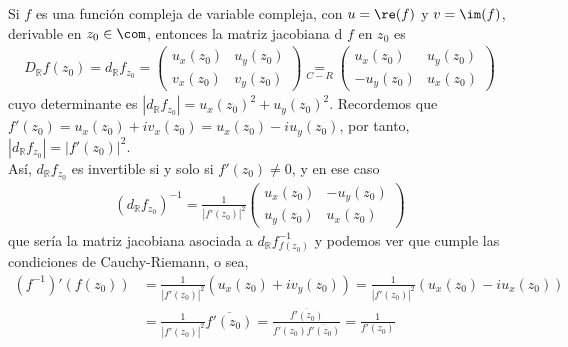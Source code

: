 \begin{obs}
Si $f$ es una función compleja de variable compleja, con $u = \re(f)$ y $v = \im(f)$, derivable en $z_0 \in \com$, entonces la matriz jacobiana d $f$ en $z_0$ es
\begin{align*}
    D_{\mathbb{R}}f(z_0) = d_{\mathbb{R}}f_{z_0} = \begin{pmatrix}
            u_x(z_0) & u_y(z_0) \\
            v_x(z_0) & v_y(z_0)
        \end{pmatrix} \underset{C-R}{=} \begin{pmatrix}
            u_x(z_0) & u_y(z_0) \\
            -u_y(z_0) & u_x(z_0)
        \end{pmatrix}
\end{align*}
cuyo determinante es $|d_{\mathbb{R}}f_{z_0}| = u_x(z_0)^2 + u_y(z_0)^2$. Recordemos que $f'(z_0) = u_x(z_0) + iv_x(z_0) = u_x(z_0) - iu_y(z_0)$, por tanto, $|d_{\mathbb{R}}f_{z_0}| = |f'(z_0)|^2$.
\\
\newline
Así, $d_{\mathbb{R}}f_{z_0}$ es invertible si y solo si $f'(z_0) \not = 0$, y en ese caso
\begin{align*}
    (d_{\mathbb{R}}f_{z_0})^{-1} = \frac{1}{|f'(z_0)|^2}\begin{pmatrix}
            u_x(z_0) & -u_y(z_0) \\
            u_y(z_0) & u_x(z_0)
        \end{pmatrix}
\end{align*}
que sería la matriz jacobiana asociada a $d_{\mathbb{R}}f^{-1}_{f(z_0)}$ y podemos ver que cumple las condiciones de Cauchy-Riemann, o sea, 
\begin{align*}
    \left(f^{-1}\right)'(f(z_0)) &= \frac{1}{|f'(z_0)|^2}(u_x(z_0) + iv_y(z_0))  = \frac{1}{|f'(z_0)|^2}(u_x(z_0) - iu_x(z_0)) \\
    &= \frac{1}{|f'(z_0)|^2}\overline{f'(z_0)} = \frac{\overline{f'(z_0)}}{f'(z_0)\overline{f'(z_0)}} = \frac{1}{f'(z_0)}
\end{align*}
\end{obs}

